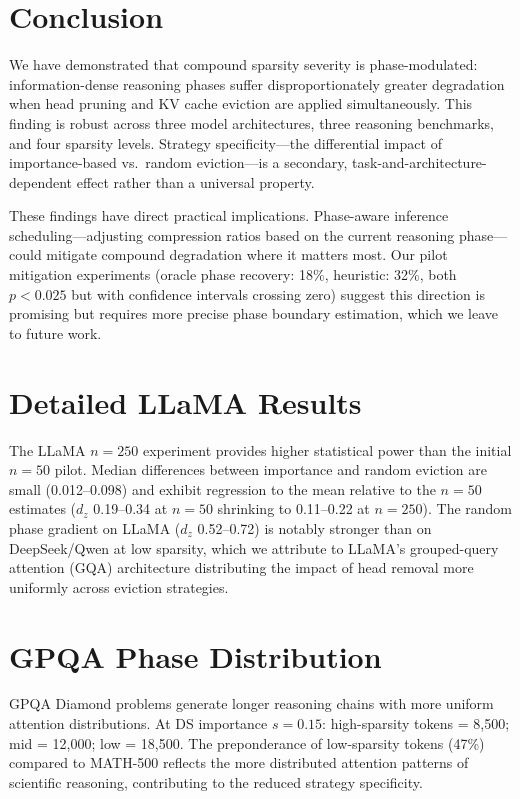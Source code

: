 \documentclass[11pt,a4paper]{article}
\begin{document}
\section{Conclusion}

We have demonstrated that compound sparsity severity is phase-modulated: information-dense reasoning phases suffer disproportionately greater degradation when head pruning and KV cache eviction are applied simultaneously. This finding is robust across three model architectures, three reasoning benchmarks, and four sparsity levels. Strategy specificity---the differential impact of importance-based vs.\ random eviction---is a secondary, task-and-architecture-dependent effect rather than a universal property.

These findings have direct practical implications. Phase-aware inference scheduling---adjusting compression ratios based on the current reasoning phase---could mitigate compound degradation where it matters most. Our pilot mitigation experiments (oracle phase recovery: 18\%, heuristic: 32\%, both $p < 0.025$ but with confidence intervals crossing zero) suggest this direction is promising but requires more precise phase boundary estimation, which we leave to future work.

%
%

\appendix

\section{Detailed LLaMA Results}
\label{app:llama}

The LLaMA $n=250$ experiment provides higher statistical power than the initial $n=50$ pilot. Median differences between importance and random eviction are small (0.012--0.098) and exhibit regression to the mean relative to the $n=50$ estimates ($d_z$ 0.19--0.34 at $n=50$ shrinking to 0.11--0.22 at $n=250$). The random phase gradient on LLaMA ($d_z$ 0.52--0.72) is notably stronger than on DeepSeek/Qwen at low sparsity, which we attribute to LLaMA's grouped-query attention (GQA) architecture distributing the impact of head removal more uniformly across eviction strategies.

\section{GPQA Phase Distribution}
\label{app:gpqa}

GPQA Diamond problems generate longer reasoning chains with more uniform attention distributions. At DS importance $s=0.15$: high-sparsity tokens = 8,500; mid = 12,000; low = 18,500. The preponderance of low-sparsity tokens (47\%) compared to MATH-500 reflects the more distributed attention patterns of scientific reasoning, contributing to the reduced strategy specificity.
\end{document}
